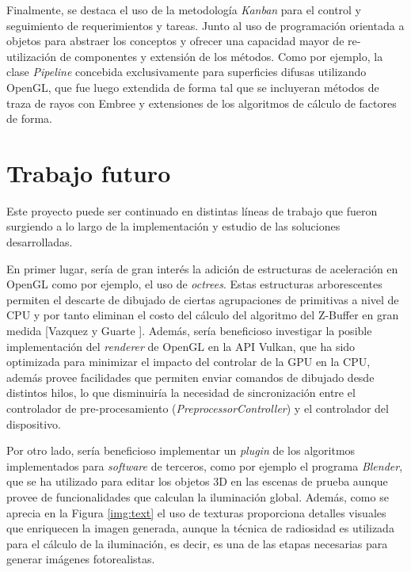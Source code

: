 Finalmente, se destaca el uso de la metodología \textit{Kanban} para el control y seguimiento de requerimientos y tareas. Junto al uso de programación orientada a objetos para abstraer los conceptos y ofrecer una capacidad mayor de re-utilización de componentes y extensión de los métodos. Como por ejemplo, la clase \textit{Pipeline} concebida exclusivamente para superficies difusas utilizando OpenGL, que fue luego extendida de forma tal que se incluyeran métodos de traza de rayos con Embree y extensiones de los algoritmos de cálculo de factores de forma. 

\section{Trabajo futuro}
\label{sec:futuro}

Este proyecto puede ser continuado en distintas líneas de trabajo que fueron surgiendo a lo largo de la implementación y estudio de las soluciones desarrolladas.

En primer lugar, sería de gran interés la adición de estructuras de aceleración en OpenGL como por ejemplo, el uso de \textit{octrees}. Estas estructuras arborescentes permiten el descarte de dibujado de ciertas agrupaciones de primitivas a nivel de CPU y por tanto eliminan el costo del cálculo del algoritmo del Z-Buffer en gran medida [Vazquez y Guarte \cite{Guarte}]. Además, sería beneficioso investigar la posible implementación del \textit{renderer} de OpenGL en la API Vulkan, que ha sido optimizada para minimizar el impacto del controlar de la GPU en la CPU, además provee facilidades que permiten enviar comandos de dibujado desde distintos hilos, lo que disminuiría la necesidad de sincronización entre el controlador de pre-procesamiento (\textit{PreprocessorController}) y el controlador del dispositivo.

Por otro lado, sería beneficioso implementar un \textit{plugin} de los algoritmos implementados para \textit{software} de terceros, como por ejemplo el programa \textit{Blender}, que se ha utilizado para editar los objetos 3D en las escenas de prueba aunque provee de funcionalidades que calculan la iluminación global. Además, como se aprecia en la Figura \ref{img:text} el uso de texturas proporciona detalles visuales que enriquecen la imagen generada, aunque la técnica de radiosidad es utilizada para el cálculo de la iluminación, es decir, es una de las etapas necesarias para generar imágenes fotorealistas.


